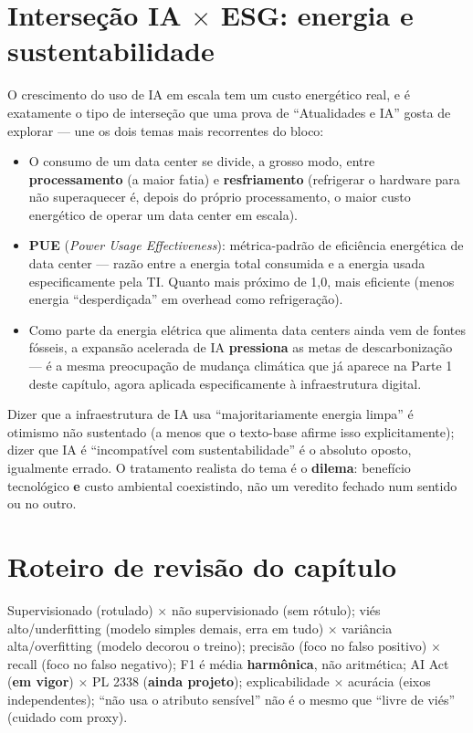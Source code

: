 \section{Interseção IA $\times$ ESG: energia e sustentabilidade}

\begin{conceito}
O crescimento do uso de IA em escala tem um custo energético real, e é
exatamente o tipo de interseção que uma prova de “Atualidades e IA” gosta
de explorar --- une os dois temas mais recorrentes do bloco:
\begin{itemize}
\item O consumo de um data center se divide, a grosso modo, entre
\textbf{processamento} (a maior fatia) e \textbf{resfriamento}
(refrigerar o hardware para não superaquecer é, depois do próprio
processamento, o maior custo energético de operar um data center em
escala).
\item \textbf{PUE} (\textit{Power Usage Effectiveness}): métrica-padrão de
eficiência energética de data center --- razão entre a energia total
consumida e a energia usada especificamente pela TI. Quanto mais próximo
de 1,0, mais eficiente (menos energia “desperdiçada” em overhead como
refrigeração).
\item Como parte da energia elétrica que alimenta data centers ainda vem
de fontes fósseis, a expansão acelerada de IA \textbf{pressiona} as metas
de descarbonização --- é a mesma preocupação de mudança climática que já
aparece na Parte 1 deste capítulo, agora aplicada especificamente à
infraestrutura digital.
\end{itemize}
\end{conceito}

\begin{cuidado}
Dizer que a infraestrutura de IA usa “majoritariamente energia limpa” é
otimismo não sustentado (a menos que o texto-base afirme isso
explicitamente); dizer que IA é “incompatível com sustentabilidade” é o
absoluto oposto, igualmente errado. O tratamento realista do tema é o
\textbf{dilema}: benefício tecnológico \textbf{e} custo ambiental
coexistindo, não um veredito fechado num sentido ou no outro.
\end{cuidado}

\section{Roteiro de revisão do capítulo}

\begin{regrapratica}
Supervisionado (rotulado) $\times$ não supervisionado (sem rótulo); viés
alto/underfitting (modelo simples demais, erra em tudo) $\times$ variância
alta/overfitting (modelo decorou o treino); precisão (foco no falso
positivo) $\times$ recall (foco no falso negativo); F1 é média
\textbf{harmônica}, não aritmética; AI Act (\textbf{em vigor}) $\times$ PL
2338 (\textbf{ainda projeto}); explicabilidade $\times$ acurácia (eixos
independentes); “não usa o atributo sensível” não é o mesmo que “livre de
viés” (cuidado com proxy).
\end{regrapratica}
